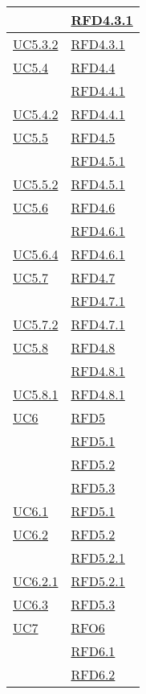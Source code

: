\begin{longtable}{|>{\centering}m{5cm}|m{5cm}<{\centering}|}
& \hyperlink{RFD4.3.1}{RFD4.3.1}\\ \hline
\hyperref[UC5.3.2]{UC5.3.2} & \hyperlink{RFD4.3.1}{RFD4.3.1}\\ \hline
\hyperref[UC5.4]{UC5.4} & \hyperlink{RFD4.4}{RFD4.4}\\
& \hyperlink{RFD4.4.1}{RFD4.4.1}\\ \hline
\hyperref[UC5.4.2]{UC5.4.2} & \hyperlink{RFD4.4.1}{RFD4.4.1}\\ \hline
\hyperref[UC5.5]{UC5.5} & \hyperlink{RFD4.5}{RFD4.5}\\
& \hyperlink{RFD4.5.1}{RFD4.5.1}\\ \hline
\hyperref[UC5.5.2]{UC5.5.2} & \hyperlink{RFD4.5.1}{RFD4.5.1}\\ \hline
\hyperref[UC5.6]{UC5.6} & \hyperlink{RFD4.6}{RFD4.6}\\
& \hyperlink{RFD4.6.1}{RFD4.6.1}\\ \hline
\hyperref[UC5.6.4]{UC5.6.4} & \hyperlink{RFD4.6.1}{RFD4.6.1}\\ \hline
\hyperref[UC5.7]{UC5.7} & \hyperlink{RFD4.7}{RFD4.7}\\
& \hyperlink{RFD4.7.1}{RFD4.7.1}\\ \hline
\hyperref[UC5.7.2]{UC5.7.2} & \hyperlink{RFD4.7.1}{RFD4.7.1}\\ \hline
\hyperref[UC5.8]{UC5.8} & \hyperlink{RFD4.8}{RFD4.8}\\
& \hyperlink{RFD4.8.1}{RFD4.8.1}\\ \hline
\hyperref[UC5.8.1]{UC5.8.1} & \hyperlink{RFD4.8.1}{RFD4.8.1}\\ \hline
\hyperref[UC6]{UC6} & \hyperlink{RFD5}{RFD5}\\
& \hyperlink{RFD5.1}{RFD5.1}\\
& \hyperlink{RFD5.2}{RFD5.2}\\
& \hyperlink{RFD5.3}{RFD5.3}\\ \hline
\hyperref[UC6.1]{UC6.1} & \hyperlink{RFD5.1}{RFD5.1}\\ \hline
\hyperref[UC6.2]{UC6.2} & \hyperlink{RFD5.2}{RFD5.2}\\
& \hyperlink{RFD5.2.1}{RFD5.2.1}\\ \hline
\hyperref[UC6.2.1]{UC6.2.1} & \hyperlink{RFD5.2.1}{RFD5.2.1}\\ \hline
\hyperref[UC6.3]{UC6.3} & \hyperlink{RFD5.3}{RFD5.3}\\ \hline
\hyperref[UC7]{UC7} & \hyperlink{RFO6}{RFO6}\\
& \hyperlink{RFD6.1}{RFD6.1}\\
& \hyperlink{RFD6.2}{RFD6.2}\\

\end{longtable}
